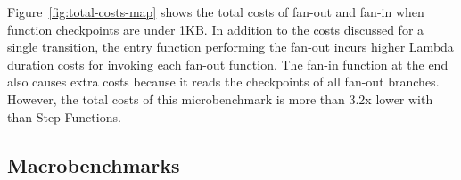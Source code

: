 Figure~\ref{fig:total-costs-map} shows the total costs of fan-out and fan-in
when function checkpoints are under 1KB. In addition to the costs discussed
for a single transition, the entry function performing the fan-out incurs
higher Lambda duration costs for invoking each fan-out function. The fan-in
function at the end also causes extra costs because it reads the checkpoints
of all fan-out branches. However, the total costs of this microbenchmark is
more than 3.2x lower with \name{} than Step Functions.













\subsection{Macrobenchmarks}


